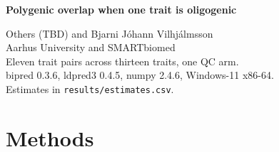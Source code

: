 \documentclass[11pt,a4paper]{article}
\begin{document}
{\LARGE\bfseries Polygenic overlap when one trait is oligogenic\par}
\medskip
{\small Others (TBD) and Bjarni J\'ohann Vilhj\'almsson\\
Aarhus University and SMARTbiomed\\[0.35em]
Eleven trait pairs across thirteen traits, one QC arm.\\
bipred 0.3.6, ldpred3 0.4.5, numpy 2.4.6, Windows-11 x86-64.\\
Estimates in \texttt{results/estimates.csv}.\par}
\bigskip






\section*{Methods}





\end{document}
